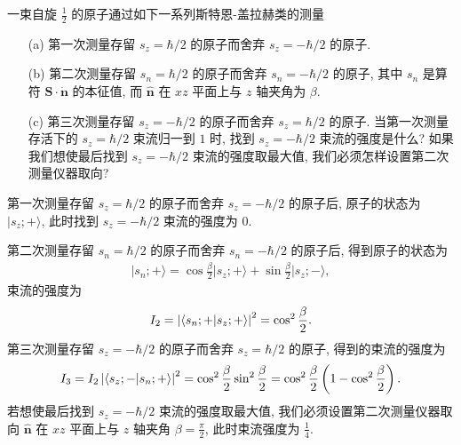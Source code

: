 \documentclass{assignment}
\begin{document}
\begin{prob}[课本习题 1.13]
    一束自旋 $\frac{1}{2}$ 的原子通过如下一系列斯特恩-盖拉赫类的测量
    \begin{itemize}
        \item[(a)] 第一次测量存留 $s_z=\hbar/2$ 的原子而舍弃 $s_z=-\hbar/2$ 的原子.
        \item[(b)] 第二次测量存留 $s_n=\hbar/2$ 的原子而舍弃 $s_n=-\hbar/2$ 的原子, 其中 $s_n$ 是算符 $\bm{S}\cdot\dot{\bm{n}}$ 的本征值, 而 $\hat{\bm{n}}$ 在 $xz$ 平面上与 $z$ 轴夹角为 $\beta$.
        \item[(c)] 第三次测量存留 $s_z=-\hbar/2$ 的原子而舍弃 $s_z=\hbar/2$ 的原子. 当第一次测量存活下的 $s_z=\hbar/2$ 束流归一到 $1$ 时, 找到 $s_z=-\hbar/2$ 束流的强度是什么? 如果我们想使最后找到 $s_z=-\hbar/2$ 束流的强度取最大值, 我们必须怎样设置第二次测量仪器取向?
    \end{itemize}
\end{prob}
\begin{sol}
    第一次测量存留 $s_z=\hbar/2$ 的原子而舍弃 $s_z=-\hbar/2$ 的原子后, 原子的状态为 $\lvert s_z;+\rangle$, 此时找到 $s_z=-\hbar/2$ 束流的强度为 $0$.

    第二次测量存留 $s_n=\hbar/2$ 的原子而舍弃 $s_n=-\hbar/2$ 的原子后, 得到原子的状态为
    \begin{align}
        \lvert s_n;+\rangle=\cos\frac{\beta}{2}\lvert s_z;+\rangle+\sin\frac{\beta}{2}\lvert s_z;-\rangle,
    \end{align}
    束流的强度为
    \begin{align}
        I_2=\left\lvert\langle s_n;+\vert s_z;+\rangle\right\rvert^2=\cos^2\frac{\beta}{2}.
    \end{align}
    第三次测量存留 $s_z=-\hbar/2$ 的原子而舍弃 $s_z=\hbar/2$ 的原子, 得到的束流的强度为
    \begin{align}
        I_3=I_2\left\lvert\langle s_z;-\vert s_n;+\rangle\right\rvert^2=\cos^2\frac{\beta}{2}\sin^2\frac{\beta}{2}=\cos^2\frac{\beta}{2}\left(1-\cos^2\frac{\beta}{2}\right).
    \end{align}
    若想使最后找到 $s_z=-\hbar/2$ 束流的强度取最大值, 我们必须设置第二次测量仪器取向 $\hat{\bm{n}}$ 在 $xz$ 平面上与 $z$ 轴夹角 $\beta=\frac{\pi}{2}$, 此时束流强度为 $\frac{1}{4}$.
\end{sol}
\end{document}
